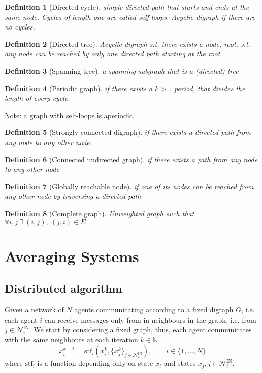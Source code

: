 \documentclass{book}
\newcommand{\N}{\mathbb{N}}
\theoremstyle{theoremv2}
\theoremstyle{defv2}
\newtheorem{definition}{Definition}[chapter]
\theoremstyle{remark}
\theoremstyle{remark}
\theoremstyle{definition}
\theoremstyle{definition}
\begin{document}
\begin{definition}[Directed cycle]
    simple directed path that starts and ends at the same node. Cycles of length one are called self-loops. Acyclic digraph if there are no cycles.
\end{definition}
\begin{definition}[Directed tree]
    Acyclic digraph s.t. there exists a node, root, s.t. any node can be reached by only one directed path starting at the root.
\end{definition}
\begin{definition}[Spanning tree]
    a spanning subgraph that is a (directed) tree
\end{definition}
\begin{definition}[Periodic graph]
    if there exists a $k>1$ period, that divides the length of every cycle.
\end{definition}
Note: a graph with self-loops is aperiodic.
\begin{definition}[Strongly connected digraph]
    if there exists a directed path from any node to any other node
\end{definition}
\begin{definition}[Connected undirected graph]
    if there exists a path from any node to any other node
\end{definition}
\begin{definition}[Globally reachable node]
    if one of its nodes can be reached from any other node by traversing a directed path
\end{definition}
\begin{definition}[Complete graph]
    Unweighted graph such that $\forall i,j\ \exists \ (i,j),\ (j,i) \in E$
\end{definition}

\chapter{Averaging Systems}
\section{Distributed algorithm}
Given a network of $N$ agents communicating according to a fixed digraph $G$, i.e. each agent $i$ can receive messages only from in-neighbours in the graph, i.e. from $j\in\mathcal{N}_i^{\text{IN}}$. 
We start by considering a fixed graph, thus, each agent communicates with the same neighbours at each iteration $k\in\N$
\[
    x_i^{k+1}=\text{stf}_i(x_i^k,\{x_j^k\}_{j\in\mathcal{N}_i^{\text{IN}}}), \qquad i\in\{1,\dots,N\}
\]
where $\text{stf}_i$ is a function depending only on state $x_i$ and states $x_j,j\in\mathcal{N}_i^{\text{IN}}$.
\end{document}
